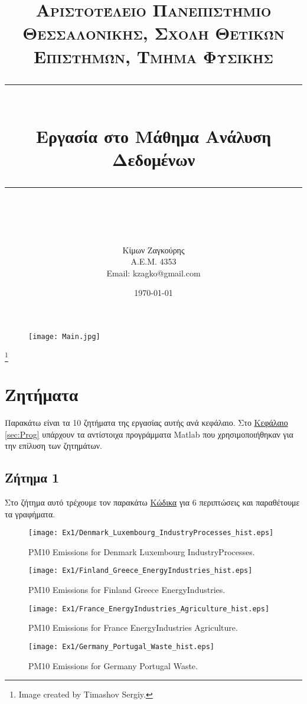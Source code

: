 \documentclass[11pt]{scrartcl} %
\title{	
	\normalfont\normalsize
	\textsc{ Αριστοτέλειο Πανεπιστήμιο Θεσσαλονίκης, Σχολή Θετικών Επιστημών, Τμήμα Φυσικής}\\ %
	\vspace{25pt} %
	\rule{\linewidth}{0.5pt}\\ %
	\vspace{20pt} %
	{\huge Εργασία στο Μάθημα Ανάλυση Δεδομένων }\\ %
	\vspace{12pt} %
	\rule{\linewidth}{2pt}\\ %
	\vspace{12pt} %
}
\author{\LARGE Κίμων Ζαγκούρης \\ A.E.M. 4353 \\ Email: kzagko@gmail.com} %
\date{\normalsize\today} %
\begin{document}
\maketitle


\begin{figure}[H]
	\centering
	\texttt{[image: Main.jpg]}
\end{figure}
\footnote{Image created by Timashov Sergiy.}
\newpage


\tableofcontents
\newpage



\section{Ζητήματα}
\label{sec:z}
Παρακάτω είναι τα 10 ζητήματα της εργασίας αυτής ανά κεφάλαιο. Στο \hyperref[sec:Prog]{Κεφάλαιο \ref*{sec:Prog}} υπάρχουν τα αντίστοιχα προγράμματα Matlab που χρησιμοποιήθηκαν για την επίλυση των ζητημάτων.


\subsection{Ζήτημα 1}
\label{subsec:z1}
Στο ζήτημα αυτό τρέχουμε τον παρακάτω \hyperref[mat:1]{Κώδικα} για 6 περιπτώσεις και παραθέτουμε τα γραφήματα.

\begin{figure}[H] 
\label{fig:1}
	\centering
	\texttt{[image: Ex1/Denmark\_Luxembourg\_IndustryProcesses\_hist.eps]}	
	\caption{PM10 Emissions for Denmark Luxembourg IndustryProcesses. }
\end{figure}

\begin{figure}[H] 
\label{fig:2}
	\centering
	\texttt{[image: Ex1/Finland\_Greece\_EnergyIndustries\_hist.eps]}	
	\caption{PM10 Emissions for Finland Greece EnergyIndustries.}
\end{figure}

\begin{figure}[H] 
	\label{fig:3}
	\centering
	\texttt{[image: Ex1/France\_EnergyIndustries\_Agriculture\_hist.eps]}	
\caption{PM10 Emissions for France EnergyIndustries Agriculture.}
\end{figure}


\begin{figure}[H]
\label{fig:4} 
	\centering
	\texttt{[image: Ex1/Germany\_Portugal\_Waste\_hist.eps]}	
\caption{PM10 Emissions for Germany Portugal Waste.}
\end{figure}
\end{document}
